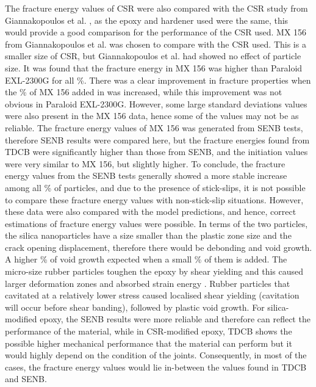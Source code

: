\documentclass[numbers=noendperiod,chapterprefix=on]{icldt} %
\begin{document}
The fracture energy values of CSR were also compared with the CSR study from Giannakopoulos et al. \cite{Giannakopoulos2011}, as the epoxy and hardener used were the same, this would provide a good comparison for the performance of the CSR used. 
MX 156 from Giannakopoulos et al. \cite{Giannakopoulos2011} was chosen to compare with the CSR used. This is a smaller size of CSR, but Giannakopoulos et al. had showed no effect of particle size. It was found that the fracture energy in MX 156 was higher than Paraloid EXL-2300G for all \%. There was a clear improvement in fracture properties when the \% of MX 156 added in was increased, while this improvement was not obvious in Paraloid EXL-2300G. However, some large standard deviations values were also present in the MX 156 data, hence some of the values may not be as reliable. The fracture energy values of MX 156 was generated from SENB tests, therefore SENB results were compared here, but the fracture energies found from TDCB were significantly higher than those from SENB, and the initiation values were very similar to MX 156, but slightly higher. 
To conclude, the fracture energy values from the SENB tests generally showed a more stable increase among all \% of particles, and due to the presence of stick-slips, it is not possible to compare these fracture energy values with non-stick-slip situations. However, these data were also compared with the model predictions, and hence, correct estimations of fracture energy values were possible. 
In terms of the two particles, the silica nanoparticles have a size smaller than the plastic zone size and the crack opening displacement, therefore there would be debonding and void growth. A higher \% of void growth expected when a small \% of them is added. 
The micro-size rubber particles toughen the epoxy by shear yielding and this caused larger deformation zones and absorbed strain energy \cite{ISO13586}. Rubber particles that cavitated at a relatively lower stress caused localised shear yielding (cavitation will occur before shear banding), followed by plastic void growth. 
For silica-modified epoxy, the SENB results were more reliable and therefore can reflect the performance of the material, while in CSR-modified epoxy, TDCB shows the possible higher mechanical performance that the material can perform but it would highly depend on the condition of the joints. Consequently, in most of the cases, the fracture energy values would lie in-between the values found in TDCB and SENB.
\end{document}
